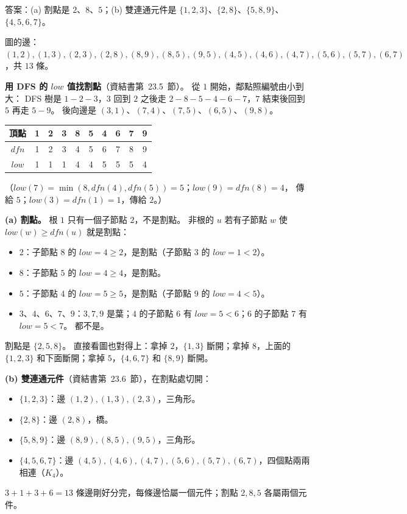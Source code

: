\begin{pastsoln}
答案：(a) 割點是 $2$、$8$、$5$；(b) 雙連通元件是 $\{1, 2, 3\}$、$\{2, 8\}$、$\{5, 8, 9\}$、
$\{4, 5, 6, 7\}$。

圖的邊：$(1,2), (1,3), (2,3), (2,8), (8,9), (8,5), (9,5), (4,5), (4,6), (4,7), (5,6), (5,7), (6,7)$，共
$13$ 條。

\textbf{用 DFS 的 $\mathit{low}$ 值找割點}（資結書第~23.5~節）。 從 $1$ 開始，鄰點照編號由小到大：
DFS 樹是 $1 - 2 - 3$，$3$ 回到 $2$ 之後走 $2 - 8 - 5 - 4 - 6 - 7$，$7$ 結束後回到 $5$ 再走 $5 - 9$。
後向邊是 $(3, 1)$、$(7, 4)$、$(7, 5)$、$(6, 5)$、$(9, 8)$。
\begin{center}
\begin{tabular}{c*{9}{c}}
\toprule
頂點 & 1 & 2 & 3 & 8 & 5 & 4 & 6 & 7 & 9 \\
\midrule
$\mathit{dfn}$ & 1 & 2 & 3 & 4 & 5 & 6 & 7 & 8 & 9 \\
$\mathit{low}$ & 1 & 1 & 1 & 4 & 4 & 5 & 5 & 5 & 4 \\
\bottomrule
\end{tabular}
\end{center}
（$\mathit{low}(7) = \min(8, \mathit{dfn}(4), \mathit{dfn}(5)) = 5$；$\mathit{low}(9) = \mathit{dfn}(8) = 4$，
傳給 $5$；$\mathit{low}(3) = \mathit{dfn}(1) = 1$，傳給 $2$。）

\textbf{(a) 割點。} 根 $1$ 只有一個子節點 $2$，不是割點。 非根的 $u$ 若有子節點 $w$ 使
$\mathit{low}(w) \ge \mathit{dfn}(u)$ 就是割點：
\begin{itemize}
\item $2$：子節點 $8$ 的 $\mathit{low} = 4 \ge 2$，是割點（子節點 $3$ 的 $\mathit{low} = 1 < 2$）。
\item $8$：子節點 $5$ 的 $\mathit{low} = 4 \ge 4$，是割點。
\item $5$：子節點 $4$ 的 $\mathit{low} = 5 \ge 5$，是割點（子節點 $9$ 的 $\mathit{low} = 4 < 5$）。
\item $3$、$4$、$6$、$7$、$9$：$3, 7, 9$ 是葉；$4$ 的子節點 $6$ 有 $\mathit{low} = 5 < 6$；$6$ 的子節點
$7$ 有 $\mathit{low} = 5 < 7$。 都不是。
\end{itemize}
割點是 $\{2, 5, 8\}$。 直接看圖也對得上：拿掉 $2$，$\{1, 3\}$ 斷開；拿掉 $8$，上面的 $\{1, 2, 3\}$
和下面斷開；拿掉 $5$，$\{4, 6, 7\}$ 和 $\{8, 9\}$ 斷開。

\textbf{(b) 雙連通元件}（資結書第~23.6~節），在割點處切開：
\begin{itemize}
\item $\{1, 2, 3\}$：邊 $(1,2), (1,3), (2,3)$，三角形。
\item $\{2, 8\}$：邊 $(2,8)$，橋。
\item $\{5, 8, 9\}$：邊 $(8,9), (8,5), (9,5)$，三角形。
\item $\{4, 5, 6, 7\}$：邊 $(4,5), (4,6), (4,7), (5,6), (5,7), (6,7)$，四個點兩兩相連（$K_4$）。
\end{itemize}
$3 + 1 + 3 + 6 = 13$ 條邊剛好分完，每條邊恰屬一個元件；割點 $2, 8, 5$ 各屬兩個元件。
\end{pastsoln}
